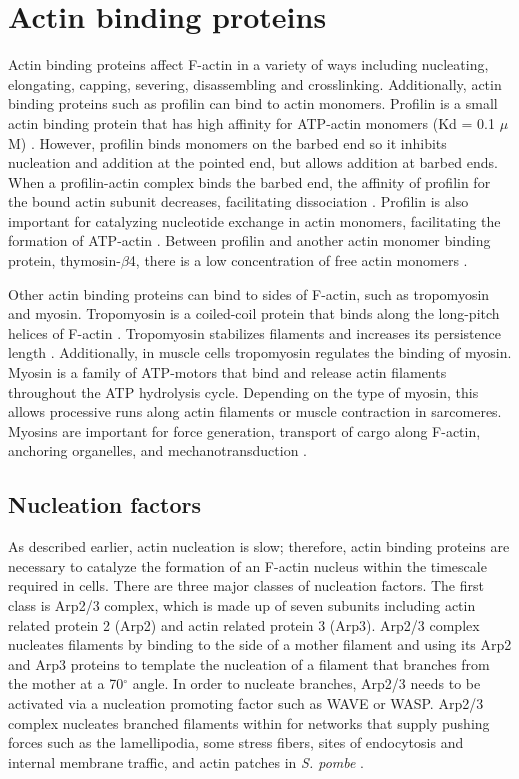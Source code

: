 \section{Actin binding proteins}\label{abps} 
Actin binding proteins affect F-actin in a variety of ways including nucleating, elongating, capping, severing, disassembling and crosslinking. Additionally, actin binding proteins such as profilin can bind to actin monomers. Profilin is a small actin binding protein that has high affinity for ATP-actin monomers (Kd = 0.1 $\mu$M) \citep{pollard_actin_2016}. However, profilin binds monomers on the barbed end so it inhibits nucleation and addition at the pointed end, but allows addition at barbed ends. When a profilin-actin complex binds the barbed end, the affinity of profilin for the bound actin subunit decreases, facilitating dissociation \citep{courtemanche_interaction_2013}. Profilin is also important for catalyzing nucleotide exchange in actin monomers, facilitating the formation of ATP-actin \citep{mockrin_acanthamoeba_1980, vinson_interactions_1998}. Between profilin and another actin monomer binding protein, thymosin-$\beta$4, there is a low concentration of free actin monomers \citep{pollard_actin_2016}.

Other actin binding proteins can bind to sides of F-actin, such as tropomyosin and myosin. Tropomyosin is a coiled-coil protein that binds along the long-pitch helices of F-actin \citep{ecken_structure_2015}. Tropomyosin stabilizes filaments and increases its persistence length \citep{sousa_electron_2010}. Additionally, in muscle cells tropomyosin regulates the binding of myosin. Myosin is a family of ATP-motors that bind and release actin filaments throughout the ATP hydrolysis cycle. Depending on the type of myosin, this allows processive runs along actin filaments or muscle contraction in sarcomeres. Myosins are important for force generation, transport of cargo along F-actin, anchoring organelles, and mechanotransduction \citep{hartman_myosin_2012}.

\subsection{Nucleation factors}\label{nucleators}
As described earlier, actin nucleation is slow; therefore, actin binding proteins are necessary to catalyze the formation of an F-actin nucleus within the timescale required in cells. There are three major classes of nucleation factors. The first class is Arp2/3 complex, which is made up of seven subunits including actin related protein 2 (Arp2) and actin related protein 3 (Arp3). Arp2/3 complex nucleates filaments by binding to the side of a mother filament and using its Arp2 and Arp3 proteins to template the nucleation of a filament that branches from the mother at a 70$^{\circ}$ angle. In order to nucleate branches, Arp2/3 needs to be activated via a nucleation promoting factor such as WAVE or WASP. Arp2/3 complex nucleates branched filaments within for networks that supply pushing forces such as the lamellipodia, some stress fibers, sites of endocytosis and internal membrane traffic, and actin patches in \textit{S. pombe} \citep{pollard_actin_2016, naumanen_mechanisms_2008, mishra_yeast_2014}.  

